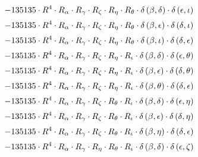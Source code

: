 \begin{subequations}
\begin{gather}
 \\[0.2em] \notag 		 - 135135 \cdot R^{4} \cdot R_{\alpha{}} \cdot R_{\gamma{}} \cdot R_{\zeta{}} \cdot R_{\eta{}} \cdot R_{\theta{}} \cdot \delta{}\left(\beta{}, \delta{}\right) \cdot \delta{}\left(\epsilon{}, \iota{}\right) 
 \\[0.2em] \notag 		 - 135135 \cdot R^{4} \cdot R_{\alpha{}} \cdot R_{\gamma{}} \cdot R_{\zeta{}} \cdot R_{\eta{}} \cdot R_{\theta{}} \cdot \delta{}\left(\beta{}, \epsilon{}\right) \cdot \delta{}\left(\delta{}, \iota{}\right) 
 \\[0.2em] \notag 		 - 135135 \cdot R^{4} \cdot R_{\alpha{}} \cdot R_{\gamma{}} \cdot R_{\zeta{}} \cdot R_{\eta{}} \cdot R_{\theta{}} \cdot \delta{}\left(\beta{}, \iota{}\right) \cdot \delta{}\left(\delta{}, \epsilon{}\right) 
 \\[0.2em] \notag 		 - 135135 \cdot R^{4} \cdot R_{\alpha{}} \cdot R_{\gamma{}} \cdot R_{\zeta{}} \cdot R_{\eta{}} \cdot R_{\iota{}} \cdot \delta{}\left(\beta{}, \delta{}\right) \cdot \delta{}\left(\epsilon{}, \theta{}\right) 
 \\[0.2em] \notag 		 - 135135 \cdot R^{4} \cdot R_{\alpha{}} \cdot R_{\gamma{}} \cdot R_{\zeta{}} \cdot R_{\eta{}} \cdot R_{\iota{}} \cdot \delta{}\left(\beta{}, \epsilon{}\right) \cdot \delta{}\left(\delta{}, \theta{}\right) 
 \\[0.2em] \notag 		 - 135135 \cdot R^{4} \cdot R_{\alpha{}} \cdot R_{\gamma{}} \cdot R_{\zeta{}} \cdot R_{\eta{}} \cdot R_{\iota{}} \cdot \delta{}\left(\beta{}, \theta{}\right) \cdot \delta{}\left(\delta{}, \epsilon{}\right) 
 \\[0.2em] \notag 		 - 135135 \cdot R^{4} \cdot R_{\alpha{}} \cdot R_{\gamma{}} \cdot R_{\zeta{}} \cdot R_{\theta{}} \cdot R_{\iota{}} \cdot \delta{}\left(\beta{}, \delta{}\right) \cdot \delta{}\left(\epsilon{}, \eta{}\right) 
 \\[0.2em] \notag 		 - 135135 \cdot R^{4} \cdot R_{\alpha{}} \cdot R_{\gamma{}} \cdot R_{\zeta{}} \cdot R_{\theta{}} \cdot R_{\iota{}} \cdot \delta{}\left(\beta{}, \epsilon{}\right) \cdot \delta{}\left(\delta{}, \eta{}\right) 
 \\[0.2em] \notag 		 - 135135 \cdot R^{4} \cdot R_{\alpha{}} \cdot R_{\gamma{}} \cdot R_{\zeta{}} \cdot R_{\theta{}} \cdot R_{\iota{}} \cdot \delta{}\left(\beta{}, \eta{}\right) \cdot \delta{}\left(\delta{}, \epsilon{}\right) 
 \\[0.2em] \notag 		 - 135135 \cdot R^{4} \cdot R_{\alpha{}} \cdot R_{\gamma{}} \cdot R_{\eta{}} \cdot R_{\theta{}} \cdot R_{\iota{}} \cdot \delta{}\left(\beta{}, \delta{}\right) \cdot \delta{}\left(\epsilon{}, \zeta{}\right) 

\end{gather}
\end{subequations}

